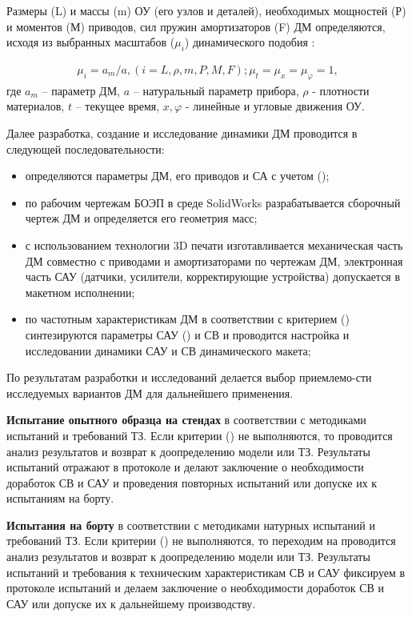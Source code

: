 Размеры (L) и массы (m) ОУ (его узлов и деталей), необходимых мощностей (Р) и моментов (М) приводов, сил пружин амортизаторов (F) ДМ определяются, исходя из выбранных масштабов ($\mu_i$) динамического подобия \cite[]{Babatko-a2-17}:

\begin{equation}
\label{eq:p2:23-a2}
\begin{alignedat}{2}
\mu_i=a_m / a, (i=L, \rho, m, P, M, F); \mu_t=\mu_x=\mu_\varphi=1 ,
\end{alignedat}
\end{equation}
где 
$a_m$ – параметр ДМ, 
$a$ – натуральный параметр прибора, 
$\rho$ - плотности материалов, 
$t$ – текущее время, 
$x, \varphi$ - линейные и угловые движения ОУ.

Далее разработка, создание и исследование динамики ДМ проводится в следующей последовательности:
\begin{itemize}
	\item определяются параметры ДМ, его приводов и СА с учетом (); 
	\item по рабочим чертежам БОЭП в среде SolidWorks разрабатывается сборочный чертеж ДМ и определяется его геометрия масс; 
	\item с использованием технологии 3D печати изготавливается механическая часть ДМ совместно с приводами и амортизаторами по чертежам ДМ, электронная часть САУ (датчики, усилители, корректирующие устройства) допускается в макетном исполнении; 
	\item по частотным характеристикам ДМ в соответствии с критерием () синтезируются параметры САУ () и СВ и проводится 
	настройка и исследовании динамики САУ и СВ динамического макета;
	
\end{itemize}

По результатам разработки и исследований делается выбор приемлемо-сти исследуемых вариантов ДМ для дальнейшего применения.

\textbf{Испытание опытного образца на стендах}
 в соответствии с методиками испытаний и требований ТЗ. Если критерии () не выполняются, то проводится анализ результатов и возврат к доопределению модели или ТЗ. Результаты испытаний отражают в протоколе и делают заключение о необходимости доработок СВ и САУ и проведения повторных испытаний или допуске их к испытаниям на борту. 

\textbf{Испытания на борту}
 в соответствии с методиками натурных испытаний и требований ТЗ. Если критерии () не выполняются, то переходим на проводится анализ результатов и возврат к доопределению модели или ТЗ. Результаты испытаний и требования к техническим характеристикам СВ и САУ фиксируем в протоколе испытаний и делаем заключение о необходимости доработок СВ и САУ или допуске их к дальнейшему производству.

